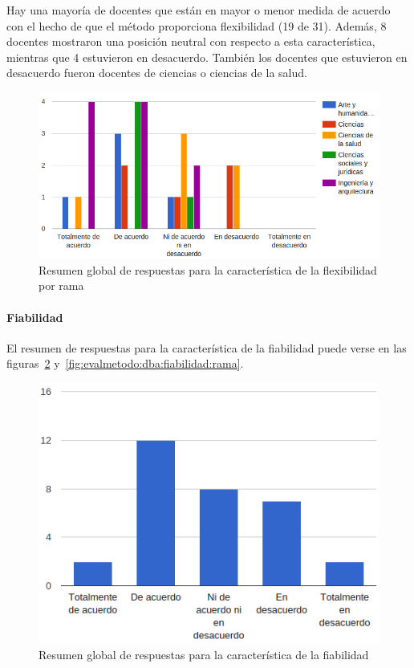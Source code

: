 Hay una mayoría de docentes que están en mayor o menor medida de acuerdo con el hecho de que el método proporciona flexibilidad (19 de 31). Además, 8 docentes mostraron una posición neutral con respecto a esta característica, mientras que 4 estuvieron en desacuerdo. También los docentes que estuvieron en desacuerdo fueron docentes de ciencias o ciencias de la salud.

\begin{figure}[h]
  \begin{center}
    \includegraphics[scale=0.5]{C_DBA_flexibilidad_rama.png}
  \end{center}
  \caption{Resumen global de respuestas para la característica de la flexibilidad por rama}
  \label{fig:evalmetodo:dba:flexibilidad:rama}
\end{figure}


\newpage
\paragraph*{Fiabilidad}

El resumen de respuestas para la característica de la fiabilidad puede verse en las figuras~\ref{fig:evalmetodo:dba:fiabilidad} y~\ref{fig:evalmetodo:dba:fiabilidad:rama}.

\begin{figure}[h]
  \begin{center}
    \includegraphics[scale=0.45]{C_DBA_fiabilidad.png}
  \end{center}
  \caption{Resumen global de respuestas para la característica de la fiabilidad}
  \label{fig:evalmetodo:dba:fiabilidad}
\end{figure}

